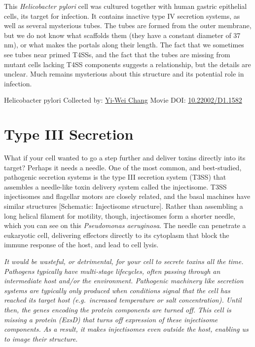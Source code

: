 \documentclass[]{tufte-book}
\begin{document}
This \emph{Helicobacter pylori} cell was cultured together with human gastric epithelial cells, its target for infection. It contains inactive type IV secretion systems, as well as several mysterious tubes. The tubes are formed from the outer membrane, but we do not know what scaffolds them (they have a constant diameter of 37 nm), or what makes the portals along their length. The fact that we sometimes see tubes near primed T4SSs, and the fact that the tubes are missing from mutant cells lacking T4SS components suggests a relationship, but the details are unclear. Much remains mysterious about this structure and its potential role in infection.



\hypertarget{htmlwidget-ee3eaaa4580b5adb2230}{}

\label{fig:9-3a}Helicobacter pylori Collected by: \protect\hyperlink{yi-wei_chang}{Yi-Wei Chang} Movie DOI: \href{https://doi.org/10.22002/D1.1582}{10.22002/D1.1582}

\hypertarget{type-iii-secretion}{%
\section{Type III Secretion}\label{type-iii-secretion}}

What if your cell wanted to go a step further and deliver toxins directly into its target? Perhaps it needs a needle. One of the most common, and best-studied, pathogenic secretion systems is the type III secretion system (T3SS) that assembles a needle-like toxin delivery system called the injectisome. T3SS injectisomes and flagellar motors are closely related, and the basal machines have similar structures {[}Schematic: Injectisome structure{]}. Rather than assembling a long helical filament for motility, though, injectisomes form a shorter needle, which you can see on this \emph{Pseudomonas aeruginosa}. The needle can penetrate a eukaryotic cell, delivering effectors directly to its cytoplasm that block the immune response of the host, and lead to cell lysis.

\emph{It would be wasteful, or detrimental, for your cell to secrete toxins all the time. Pathogens typically have multi-stage lifecycles, often passing through an intermediate host and/or the environment. Pathogenic machinery like secretion systems are typically only produced when conditions signal that the cell has reached its target host (e.g.~increased temperature or salt concentration). Until then, the genes encoding the protein components are turned off. This cell is missing a protein (ExsD) that turns off expression of these injectisome components. As a result, it makes injectisomes even outside the host, enabling us to image their structure.}
\end{document}
